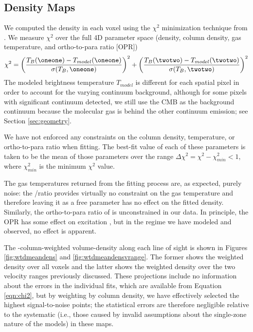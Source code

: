 \subsection{Density Maps}
\label{sec:densmaps}
We computed the density in each voxel using the $\chi^2$ minimization technique
from \citet{Ginsburg2011a}.  We measure $\chi^2$ over the full 4D parameter
space (density, column density, gas temperature,
and ortho-to-para ratio [OPR])
\begin{equation}
    \label{eqn:chi2}
    \chi^2 =  \left( \frac{T_B(\oneone)-T_{model}(\oneone)}{\sigma(T_B,\oneone)}\right)^2 +
              \left( \frac{T_B(\twotwo)-T_{model}(\twotwo)}{\sigma(T_B,\twotwo)}\right)^2
\end{equation}
The modeled brightness temperature $T_{model}$ is different for each spatial
pixel in order to account for the varying continuum background, although for
some pixels with significant
continuum detected, we still use the CMB as the background continuum because
the molecular gas is behind the other continuum emission; see Section
\ref{sec:geometry}.

We have not enforced any constraints on the column density,
temperature, or ortho-to-para ratio when fitting.  The best-fit value of each
of these parameters is taken to be the mean of those parameters over the range
$\Delta \chi^2 = \chi^2 - \chi^2_{min} < 1$, where $\chi^2_{min}$ is the
minimum $\chi^2$ value.

The gas temperatures returned from the fitting process are, as expected, purely
noise: the \formaldehyde \oneone/\twotwo ratio provides virtually no constraint
on the gas temperature and therefore leaving it as a free parameter has no
effect on the fitted density.  Similarly, the ortho-to-para ratio of \hh is
unconstrained in our data.  In principle, the \hh OPR has some effect on
\formaldehyde excitation \citep{Troscompt2009a}, but in the regime we have
modeled and observed, no effect is apparent.


The \ortho-column-weighted volume-density along each line of sight is shown in
Figures \ref{fig:wtdmeandens} and \ref{fig:wtdmeandensvrange}.  The former
shows the weighted density over all voxels and the latter shows the weighted
density over the two velocity ranges previously discussed.  These projections
include no information about the errors in the individual fits, which are
available from Equation \ref{eqn:chi2}, but by weighting by column density, we
have effectively selected the highest signal-to-noise points; the statistical
errors are therefore negligible relative to the systematic (i.e., those caused
by invalid assumptions about the single-zone nature of the models) in these
maps.



